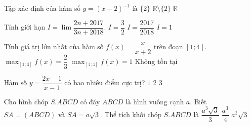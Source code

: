\begin{ex}%
Tập xác định của hàm số $y=(x-2)^{-1}$ là
{$\{2\}$}
{\True $\mathbb{R}\setminus\{2\}$}
{$\mathbb{R}$}
\end{ex}

\begin{ex}%
Tính giới hạn $I=\lim\dfrac{2n+2017}{3n+2018}$.
{$I=\dfrac{3}{2}$}
{$I=\dfrac{2017}{2018}$}
{$I=1$}
\end{ex}

\begin{ex}%
Tính giá trị lớn nhất của hàm số $f(x)=\dfrac{x}{x+2}$ trên đoạn $[1;4]$.
{\True $\displaystyle\max_{[1;4]}f(x)=\dfrac{2}{3}$}
{$\displaystyle\max_{[1;4]}f(x)=1$}
{Không tồn tại}
\end{ex}

\begin{ex}%
Hàm số $y=\dfrac{2x-1}{x-1}$ có bao nhiêu điểm cực trị?
{$1$}
{$2$}
{$3$}
\end{ex}

\begin{ex}%
Cho hình chóp $S.ABCD$ có đáy $ABCD$ là hình vuông cạnh $a$. Biết $SA\perp (ABCD)$ và $SA=a\sqrt{3}$. Thể tích khối chóp $S.ABCD$ là
{\True $\dfrac{a^3\sqrt{3}}{3}$}
{$\dfrac{a^3}{4}$}
{$a^3\sqrt{3}$}
\end{ex}

